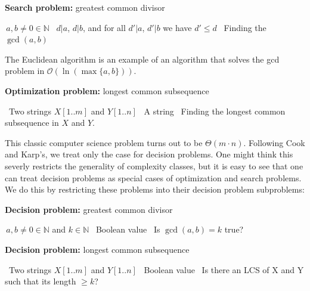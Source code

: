 \documentclass{amsart}
\theoremstyle{plain}
\newcommand{\bigo}{\mathcal{O}}
\begin{document}
\begin{algorithm}[h]
  \caption*{\textbf{Search problem:} greatest common divisor}
  \begin{algorithmic}[1]
    \Require\,$a, b\neq 0\in\mathbb{N}$
    \Ensure\, $d|a$, $d|b$, and for all $d'|a$, $d'|b$ we have $d'\leq d$
    \Description\, Finding the $\gcd(a, b)$
  \end{algorithmic}
\end{algorithm}

The Euclidean algorithm is an example of an algorithm that solves the gcd problem in
$\bigo(\ln(\max\{a,b\}))$.

\begin{algorithm}[h]
  \caption*{\textbf{Optimization problem:} longest common subsequence}
  \begin{algorithmic}[1]
    \Require\, Two strings $X[1..m]$ and $Y[1..n]$
    \Ensure\, A string
    \Description\, Finding the longest common subsequence in $X$ and $Y$.
  \end{algorithmic}
\end{algorithm}

This classic computer science problem turns out to be $\Theta(m\cdot n)$. Following Cook and
Karp's, we treat only the case for decision problems. One might think this severly restricts the
generality of complexity classes, but it is easy to see that one can treat decision problems as
special cases of optimization and search problems. We do this by restricting these problems into
their decision problem subproblems:

\begin{algorithm}[h]
  \caption*{\textbf{Decision problem:} greatest common divisor}
  \begin{algorithmic}[1]
    \Require\,$a, b\neq 0\in\mathbb{N}$ and $k\in\mathbb{N}$
    \Ensure\, Boolean value
    \Description\, Is $\gcd(a, b)=k$ true?
  \end{algorithmic}
\end{algorithm}

\begin{algorithm}[h]
  \caption*{\textbf{Decision problem:} longest common subsequence}
  \begin{algorithmic}[1]
    \Require\, Two strings $X[1..m]$ and $Y[1..n]$
    \Ensure\, Boolean value
    \Description\, Is there an LCS of X and Y such that its length $\geq k$?
  \end{algorithmic}
\end{algorithm}
\end{document}
